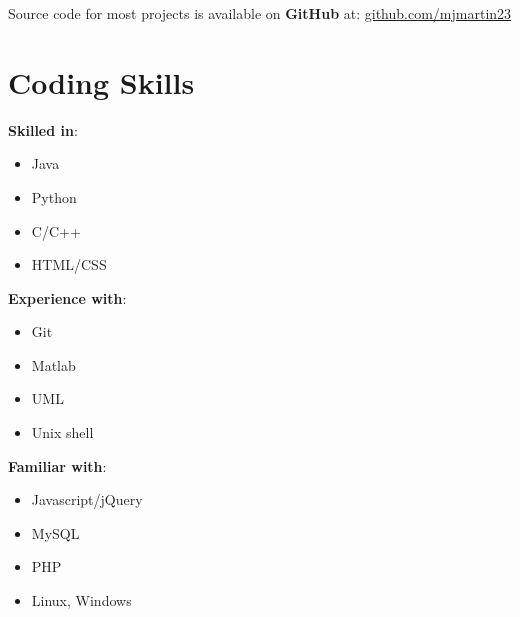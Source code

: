 \documentclass{myresume}
\begin{document}


Source code for most projects is available on \textbf{GitHub} at: \href{https://github.com/mjmartin23}{github.com/mjmartin23}

\section{Coding Skills}

\begin{minipage}[t]{0.33\textwidth}
	\textbf{Skilled in}:
	\begin{itemize}
		\vspace{-.5em}\item Java
		\vspace{-.75em}\item Python
		\vspace{-.75em}\item C/C++
		\vspace{-.75em}\item HTML/CSS
	\end{itemize}
\end{minipage}
\begin{minipage}[t]{0.33\textwidth}
	\textbf{Experience with}:
	\begin{itemize}
		\vspace{-.5em}\item Git
		\vspace{-.75em}\item Matlab
		\vspace{-.75em}\item UML
		\vspace{-.75em}\item Unix shell
	\end{itemize}
\end{minipage}
\begin{minipage}[t]{0.33\textwidth}
	\textbf{Familiar with}:
	\begin{itemize}
		\vspace{-.5em}\item Javascript/jQuery
		\vspace{-.75em}\item MySQL
		\vspace{-.75em}\item PHP
		\vspace{-.75em}\item Linux, Windows
	\end{itemize}
\end{minipage}
\end{document}
